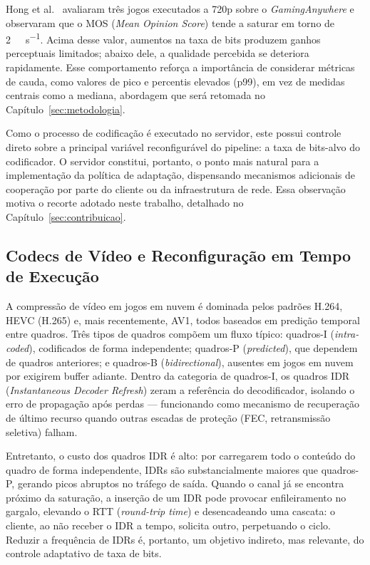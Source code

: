Hong et al.~\cite{hong2015} avaliaram três jogos executados a 720p sobre o \emph{GamingAnywhere} e observaram que o MOS (\emph{Mean Opinion Score}) tende a saturar em torno de \SI{2}{\mega\bit\per\second}. Acima desse valor, aumentos na taxa de bits produzem ganhos perceptuais limitados; abaixo dele, a qualidade percebida se deteriora rapidamente. Esse comportamento reforça a importância de considerar métricas de cauda, como valores de pico e percentis elevados (p99), em vez de medidas centrais como a mediana, abordagem que será retomada no Capítulo~\ref{sec:metodologia}.

Como o processo de codificação é executado no servidor, este possui controle direto sobre a principal variável reconfigurável do pipeline: a taxa de bits-alvo do codificador. O servidor constitui, portanto, o ponto mais natural para a implementação da política de adaptação, dispensando mecanismos adicionais de cooperação por parte do cliente ou da infraestrutura de rede. Essa observação motiva o recorte adotado neste trabalho, detalhado no Capítulo~\ref{sec:contribuicao}.


\subsection{Codecs de Vídeo e Reconfiguração em Tempo de Execução}

A compressão de vídeo em jogos em nuvem é dominada pelos padrões
H.264, HEVC (H.265) e, mais recentemente, AV1, todos baseados em
predição temporal entre quadros. Três tipos de quadros compõem
um fluxo típico: quadros-I (\emph{intra-coded}), codificados de
forma independente; quadros-P (\emph{predicted}), que dependem
de quadros anteriores; e quadros-B (\emph{bidirectional}),
ausentes em jogos em nuvem por exigirem buffer adiante. Dentro
da categoria de quadros-I, os quadros IDR (\emph{Instantaneous
Decoder Refresh}) zeram a referência do decodificador, isolando
o erro de propagação após perdas — funcionando como mecanismo de
recuperação de último recurso quando outras escadas de proteção
(FEC, retransmissão seletiva) falham.

Entretanto, o custo dos quadros IDR é alto: por carregarem todo o
conteúdo do quadro de forma independente, IDRs são
substancialmente maiores que quadros-P, gerando picos abruptos
no tráfego de saída. Quando o canal já se encontra próximo da
saturação, a inserção de um IDR pode provocar enfileiramento no
gargalo, elevando o RTT (\emph{round-trip time}) e desencadeando
uma cascata: o cliente, ao não receber o IDR a tempo, solicita
outro, perpetuando o ciclo. Reduzir a frequência de IDRs é,
portanto, um objetivo indireto, mas relevante, do controle
adaptativo de taxa de bits.

